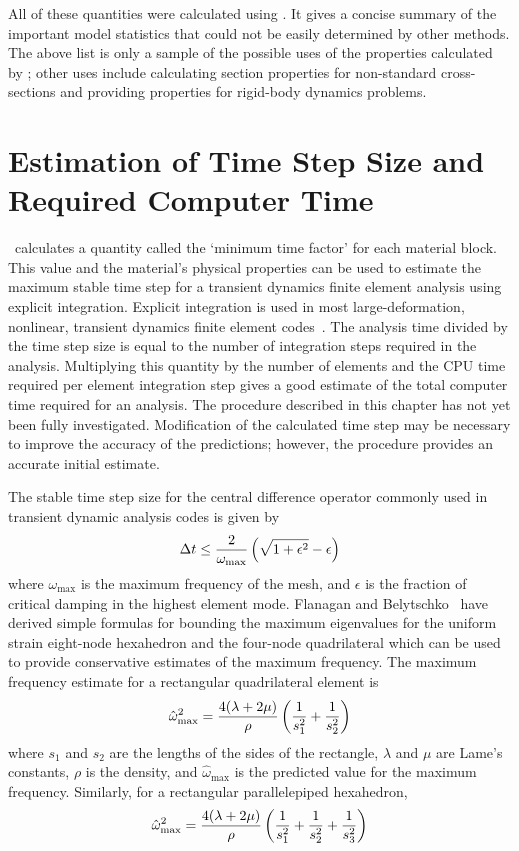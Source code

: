All of these quantities were calculated using \NUM. It gives a concise
summary of the important model statistics that could not be easily
determined by other methods.  The above list is only a sample of the
possible uses of the properties calculated by \NUM; other uses include
calculating section properties for non-standard cross-sections and
providing properties for rigid-body dynamics problems.

\chapter{Estimation of Time Step Size and Required Computer
Time}\label{s:time}

\NUM\ calculates a quantity called the `minimum time factor' for each
material block.  This value and the material's physical properties can
be used to estimate the maximum stable time step for a transient
dynamics finite element analysis using explicit integration. Explicit
integration is used in most large-deformation, nonlinear, transient
dynamics finite element codes~\cite{pronto,dyna}. The analysis time
divided by the time step size is equal to the number of integration
steps required in the analysis. Multiplying this quantity by the
number of elements and the CPU time required per element integration
step gives a good estimate of the total computer time required for an
analysis.  The procedure described in this chapter has not yet been
fully investigated.  Modification of the calculated time step may be
necessary to improve the accuracy of the predictions; however, the
procedure provides an accurate initial estimate.

The stable time step size for the central difference operator commonly
used in transient dynamic analysis codes is given by~\cite{cook}
\begin{equation}
\Delta t \leq {2\over \omega_{\max}} \left(\sqrt{1+\epsilon^2}-\epsilon\right)
\end{equation}
where $\omega_{\max}$ is the maximum frequency of the mesh, and
$\epsilon$
is the fraction of critical damping in the highest element mode.
Flanagan and Belytschko~\cite{flanagan} have derived simple formulas
for bounding the maximum eigenvalues for the uniform strain eight-node
hexahedron and the four-node quadrilateral which can be used to
provide conservative estimates of the maximum frequency.  The maximum
frequency estimate for a rectangular quadrilateral element is
\begin{equation}
\hat\omega_{\max}^2 = {4(\lambda + 2\mu)\over\rho}\left({1\over s_1^2} +
   {1\over s_2^2}\right)
\end{equation}
where $s_1$ and $s_2$ are the lengths of the sides of the rectangle,
$\lambda$ and $\mu$ are Lame's constants, $\rho$ is the density, and
$\hat\omega_{\max}$ is the predicted value for the maximum frequency.
Similarly, for a rectangular parallelepiped hexahedron,
\begin{equation}
\hat\omega_{\max}^2 = {4(\lambda + 2\mu)\over\rho}\left({1\over s_1^2} +
   {1\over s_2^2}+{1\over s_3^2}\right)
\end{equation}


